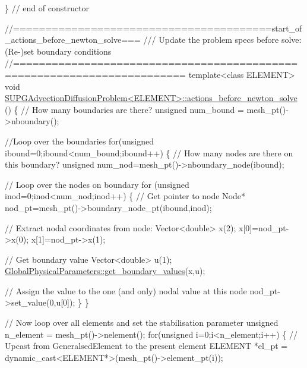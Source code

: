 \begin{DoxyCodeInclude}
\} \textcolor{comment}{// end of constructor}


\textcolor{comment}{//========================================start\_of\_actions\_before\_newton\_solve===}\textcolor{comment}{}
\textcolor{comment}{/// Update the problem specs before solve: (Re-)set boundary conditions}
\textcolor{comment}{}\textcolor{comment}{//========================================================================}
\textcolor{keyword}{template}<\textcolor{keyword}{class} ELEMENT>
\textcolor{keywordtype}{void} \hyperlink{classSUPGAdvectionDiffusionProblem_affa45863033de517e1fba088aaae7eb5}{SUPGAdvectionDiffusionProblem<ELEMENT>::actions\_before\_newton\_solve}
      ()
\{
 \textcolor{comment}{// How many boundaries are there?}
 \textcolor{keywordtype}{unsigned} num\_bound = mesh\_pt()->nboundary();
 
 \textcolor{comment}{//Loop over the boundaries}
 \textcolor{keywordflow}{for}(\textcolor{keywordtype}{unsigned} ibound=0;ibound<num\_bound;ibound++)
  \{
   \textcolor{comment}{// How many nodes are there on this boundary?}
   \textcolor{keywordtype}{unsigned} num\_nod=mesh\_pt()->nboundary\_node(ibound);

   \textcolor{comment}{// Loop over the nodes on boundary}
   \textcolor{keywordflow}{for} (\textcolor{keywordtype}{unsigned} inod=0;inod<num\_nod;inod++)
    \{
     \textcolor{comment}{// Get pointer to node}
     Node* nod\_pt=mesh\_pt()->boundary\_node\_pt(ibound,inod);

     \textcolor{comment}{// Extract nodal coordinates from node:}
     Vector<double> x(2);
     x[0]=nod\_pt->x(0);
     x[1]=nod\_pt->x(1);

     \textcolor{comment}{// Get boundary value}
     Vector<double> u(1);
     \hyperlink{namespaceGlobalPhysicalParameters_a6e1db5726436a705e9d400fedf914cef}{GlobalPhysicalParameters::get\_boundary\_values}(x,u);

     \textcolor{comment}{// Assign the value to the one (and only) nodal value at this node}
     nod\_pt->set\_value(0,u[0]);
    \}
  \} 

 \textcolor{comment}{// Now loop over all elements and set the stabilisation parameter}
 \textcolor{keywordtype}{unsigned} n\_element = mesh\_pt()->nelement();
 \textcolor{keywordflow}{for}(\textcolor{keywordtype}{unsigned} i=0;i<n\_element;i++)
  \{
   \textcolor{comment}{// Upcast from GeneralsedElement to the present element}
   ELEMENT *el\_pt = \textcolor{keyword}{dynamic\_cast<}ELEMENT*\textcolor{keyword}{>}(mesh\_pt()->element\_pt(i));
   


\end{DoxyCodeInclude}
